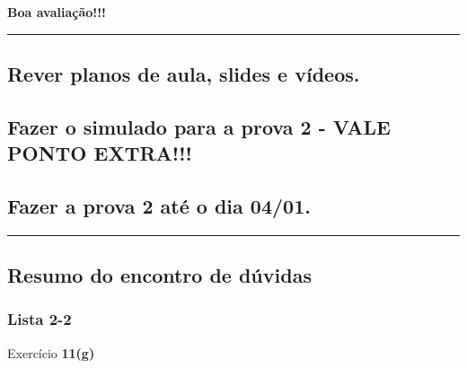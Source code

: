 \documentclass[
]{article}
\begin{document}
\textbf{Boa avaliação!!!}

\begin{center}\rule{0.5\linewidth}{0.5pt}\end{center}

\hypertarget{rever-planos-de-aula-slides-e-vuxeddeos.}{%
\subsection{Rever planos de aula, slides e
vídeos.}\label{rever-planos-de-aula-slides-e-vuxeddeos.}}

\hypertarget{fazer-o-simulado-para-a-prova-2---vale-ponto-extra}{%
\subsection{Fazer o simulado para a prova 2 - VALE PONTO
EXTRA!!!}\label{fazer-o-simulado-para-a-prova-2---vale-ponto-extra}}

\hypertarget{fazer-a-prova-2-atuxe9-o-dia-0401.}{%
\subsection{Fazer a prova 2 até o dia
04/01.}\label{fazer-a-prova-2-atuxe9-o-dia-0401.}}

\begin{center}\rule{0.5\linewidth}{0.5pt}\end{center}

\hypertarget{resumo-do-encontro-de-duxfavidas}{%
\subsection{Resumo do encontro de
dúvidas}\label{resumo-do-encontro-de-duxfavidas}}

\hypertarget{lista-2-2}{%
\subsubsection{Lista 2-2}\label{lista-2-2}}

Exercício \textbf{11(g)}
\end{document}
